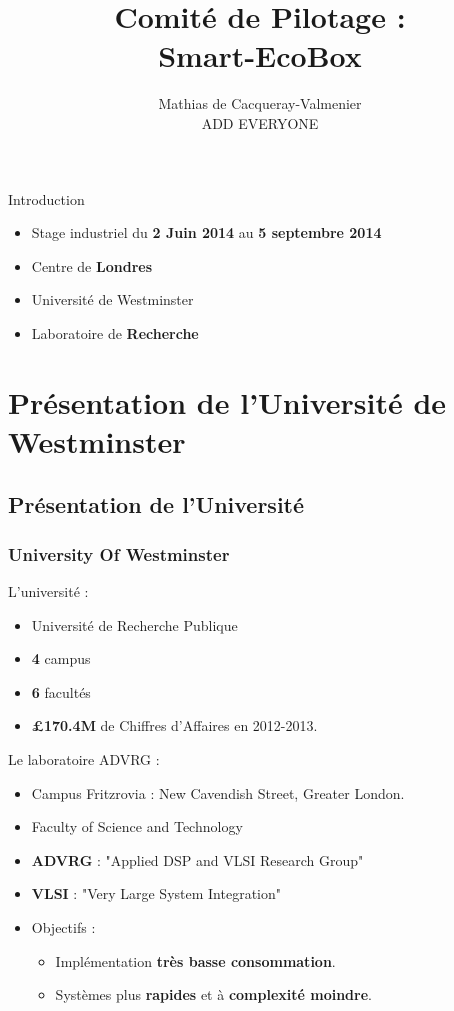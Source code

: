 \documentclass{beamer}
\title[Smart-EcoBox]{Comité de Pilotage :\\
Smart-EcoBox}
\author{Mathias de Cacqueray-Valmenier \\ ADD EVERYONE}
\institute{\textsc{ENSEIRB-MATMECA}}
\begin{document}
\begin{frame}
\titlepage
\end{frame}


\begin{frame}{Introduction}
  \begin{itemize}
    \item Stage industriel du \textbf{2 Juin 2014} au \textbf{5 septembre 2014}
    \item Centre de \textbf{Londres}
    \item Université de Westminster
    \item Laboratoire de \textbf{Recherche}
  \end{itemize}
\end{frame}
\begin{frame}
 \tableofcontents
\end{frame}

\section{Présentation de l'Université de Westminster}
\subsection{Présentation de l'Université}
\begin{frame}
  \frametitle{University Of Westminster}
  L'université :
  \begin{itemize}
    \item Université de Recherche Publique
    \item \textbf{4} campus
    \item \textbf{6} facultés
    \item \textbf{£170.4M} de Chiffres d'Affaires en 2012-2013.
  \end{itemize}
  Le laboratoire ADVRG :
  \begin{itemize}
    \item Campus Fritzrovia : New Cavendish Street, Greater London.
    \item Faculty of Science and Technology
    \item \textbf{ADVRG} : "Applied DSP and VLSI Research Group"
    \item \textbf{VLSI} : "Very Large System Integration"
    \item Objectifs :
    \begin{itemize}
      \item Implémentation \textbf{très basse consommation}.
      \item Systèmes plus \textbf{rapides} et à \textbf{complexité moindre}.
    \end{itemize}
  \end{itemize}
\end{frame}
\end{document}
